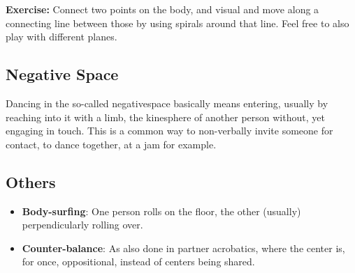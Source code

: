 \textbf{Exercise:} Connect two points on the body, and visual and move along a connecting line between those by using spirals around that line.
Feel free to also play with different planes.

\subsection{Negative Space}\label{subsec:negative-space}

Dancing in the so-called \gls{negativespace} basically means entering, usually by reaching into it with a limb, the \gls{kinesphere} of another person without, yet engaging in touch.
This is a common way to non-verbally invite someone for contact, to dance together, at a jam for example.

\subsection{Others}\label{subsec:others}

\begin{itemize}
    \item \textbf{Body-surfing}: One person rolls on the floor, the other (usually) perpendicularly rolling over.
    \item \textbf{Counter-balance}: As also done in partner acrobatics, where the center is, for once, oppositional, instead of centers being shared.
\end{itemize}
